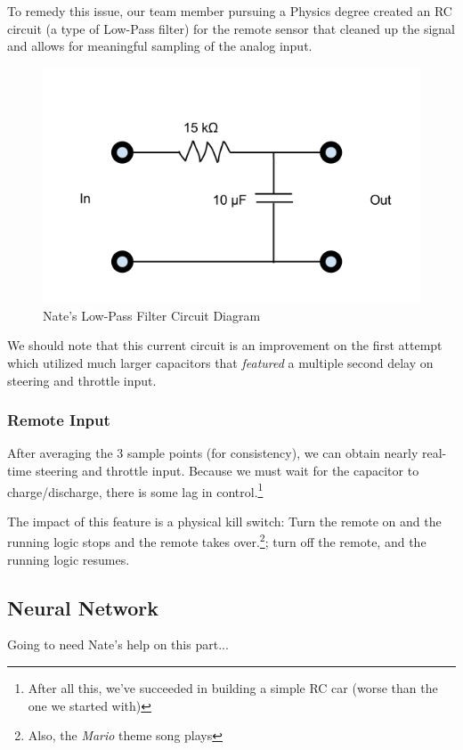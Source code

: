 \documentclass[12pt]{article}
\begin{document}
To remedy this issue, our team member pursuing a Physics degree created an RC circuit (a type of Low-Pass filter) for the remote sensor that cleaned up the signal and allows for meaningful sampling of the analog input.  
\begin{figure}[h]
\centerline{\includegraphics[scale=.5]{img/circuit}}
\caption{Nate's Low-Pass Filter Circuit Diagram}
\end{figure}

We should note that this current circuit is an improvement on the first attempt which utilized much larger capacitors that \textit{featured} a multiple second delay on steering and throttle input.

\subsubsection*{Remote Input}
After averaging the 3 sample points (for consistency), we can obtain nearly real-time steering and throttle input.  Because we must wait for the capacitor to charge/discharge, there is some lag in control.\footnote{After all this, we've succeeded in building a simple RC car (worse than the one we started with)}

The impact of this feature is a physical kill switch: Turn the remote on and the running logic stops and the remote takes over.\footnote{Also, the \textit{Mario} theme song plays}; turn off the remote, and the running logic resumes.


\clearpage
\subsection{Neural Network}
{\color{red} Going to need Nate's help on this part...}
\end{document}
